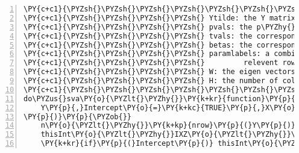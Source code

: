 \begin{Verbatim}[commandchars=\\\{\},codes={\catcode`\$=3\catcode`\^=7\catcode`\_=8},gobble=0,numbers=left,fontfamily=fvm,fontshape=n,fontsize=\footnotesize,tabsize=2]
\PY{c+c1}{\PYZsh{}\PYZsh{}\PYZsh{}\PYZsh{}\PYZsh{}\PYZsh{}\PYZsh{}\PYZsh{}\PYZsh{}\PYZsh{}\PYZsh{}\PYZsh{}\PYZsh{}\PYZsh{}\PYZsh{}\PYZsh{}\PYZsh{}\PYZsh{}\PYZsh{}\PYZsh{}\PYZsh{}\PYZsh{}\PYZsh{}\PYZsh{}\PYZsh{}\PYZsh{}\PYZsh{}\PYZsh{}\PYZsh{}\PYZsh{}\PYZsh{}\PYZsh{}\PYZsh{}\PYZsh{}\PYZsh{}\PYZsh{} OUTPUTS \PYZsh{}\PYZsh{}\PYZsh{}\PYZsh{}\PYZsh{}\PYZsh{}\PYZsh{}\PYZsh{}\PYZsh{}\PYZsh{}\PYZsh{}\PYZsh{}\PYZsh{}\PYZsh{}\PYZsh{}\PYZsh{}\PYZsh{}\PYZsh{}\PYZsh{}\PYZsh{}\PYZsh{}\PYZsh{}\PYZsh{}\PYZsh{}\PYZsh{}\PYZsh{}\PYZsh{}\PYZsh{}\PYZsh{}\PYZsh{}\PYZsh{}\PYZsh{}\PYZsh{}}
\PY{c+c1}{\PYZsh{}\PYZsh{}\PYZsh{}\PYZsh{} Ytilde: the Y matrix with $Z\beta_j + W\delta_j$ removed}
\PY{c+c1}{\PYZsh{}\PYZsh{}\PYZsh{}\PYZsh{} pvals: the p\PYZhy{}values of Ytilde regressed on $\mu_j + X\alpha_j + Z\beta_j + W\delta_j$}
\PY{c+c1}{\PYZsh{}\PYZsh{}\PYZsh{}\PYZsh{} tvals: the corresponding t\PYZhy{}statistics}
\PY{c+c1}{\PYZsh{}\PYZsh{}\PYZsh{}\PYZsh{} betas: the corresponding $\alpha_j,\beta_j,\delta_j$ estimates}
\PY{c+c1}{\PYZsh{}\PYZsh{}\PYZsh{}\PYZsh{} paramlabels: a combination of I (intercept), X, Z, W to signify the }
\PY{c+c1}{\PYZsh{}\PYZsh{}\PYZsh{}\PYZsh{}         relevent rows of p\PYZhy{}vals/tvals/betas}
\PY{c+c1}{\PYZsh{}\PYZsh{}\PYZsh{}\PYZsh{} W: the eigen vectors matrix}
\PY{c+c1}{\PYZsh{}\PYZsh{}\PYZsh{}\PYZsh{} H: the number of columns of W (used eigen\PYZhy{}vectors)}
\PY{c+c1}{\PYZsh{}\PYZsh{}\PYZsh{}\PYZsh{}\PYZsh{}\PYZsh{}\PYZsh{}\PYZsh{}\PYZsh{}\PYZsh{}\PYZsh{}\PYZsh{}\PYZsh{}\PYZsh{}\PYZsh{}\PYZsh{}\PYZsh{}\PYZsh{}\PYZsh{}\PYZsh{}\PYZsh{}\PYZsh{}\PYZsh{}\PYZsh{}\PYZsh{}\PYZsh{}\PYZsh{}\PYZsh{}\PYZsh{}\PYZsh{}\PYZsh{}\PYZsh{}\PYZsh{}\PYZsh{}\PYZsh{}\PYZsh{}\PYZsh{}\PYZsh{}\PYZsh{}\PYZsh{}\PYZsh{}\PYZsh{}\PYZsh{}\PYZsh{}\PYZsh{}\PYZsh{}\PYZsh{}\PYZsh{}\PYZsh{}\PYZsh{}\PYZsh{}\PYZsh{}\PYZsh{}\PYZsh{}\PYZsh{}\PYZsh{}\PYZsh{}\PYZsh{}\PYZsh{}\PYZsh{}\PYZsh{}\PYZsh{}\PYZsh{}\PYZsh{}\PYZsh{}\PYZsh{}\PYZsh{}\PYZsh{}\PYZsh{}\PYZsh{}\PYZsh{}\PYZsh{}\PYZsh{}\PYZsh{}\PYZsh{}\PYZsh{}\PYZsh{}\PYZsh{}\PYZsh{}}
do\PYZus{}sva\PY{o}{\PYZlt{}\PYZhy{}}\PY{k+kr}{function}\PY{p}{(}
	Y\PY{p}{,}Intercept\PY{o}{=}\PY{k+kc}{TRUE}\PY{p}{,}X\PY{o}{=}\PY{k+kc}{NULL}\PY{p}{,}Z\PY{o}{=}\PY{k+kc}{NULL}\PY{p}{,}nosigsv\PY{o}{=}\PY{k+kc}{NULL}\PY{p}{,}verbose\PY{o}{=}\PY{k+kc}{FALSE}\PY{p}{,}seed\PY{o}{=}\PY{k+kc}{NULL}
\PY{p}{)}\PY{p}{\PYZob{}}
	n\PY{o}{\PYZlt{}\PYZhy{}}\PY{k+kp}{nrow}\PY{p}{(}Y\PY{p}{)}
	thisInt\PY{o}{\PYZlt{}\PYZhy{}}IXZ\PY{o}{\PYZlt{}\PYZhy{}}\PY{k+kc}{NULL}
	\PY{k+kr}{if}\PY{p}{(}Intercept\PY{p}{)} thisInt\PY{o}{\PYZlt{}\PYZhy{}}\PY{k+kt}{matrix}\PY{p}{(}\PY{l+m}{1}\PY{p}{,}nrow\PY{o}{=}n\PY{p}{,}ncol\PY{o}{=}\PY{l+m}{1}\PY{p}{,}dimnames\PY{o}{=}\PY{k+kt}{list}\PY{p}{(}\PY{k+kc}{NULL}\PY{p}{,}\PY{l+s}{\PYZdq{}}\PY{l+s}{Intcpt\PYZdq{}}\PY{p}{)}\PY{p}{)}

\end{Verbatim}
